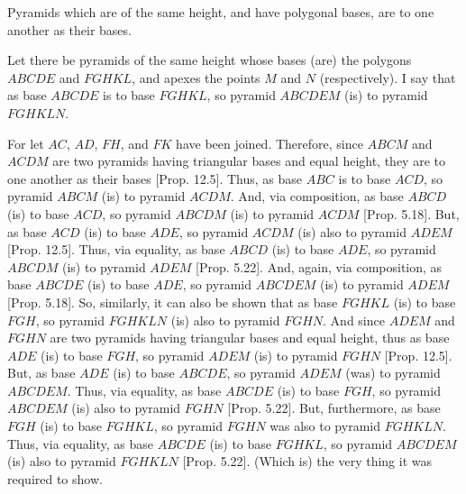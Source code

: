 \begin{Parallel}{}{}
{Pyramids which are of the same height, and have polygonal bases, are to one
another as their bases.\\

\centerline{}

Let there be pyramids of the same height whose bases (are) the polygons $ABCDE$ and $FGHKL$,
and apexes the points $M$ and $N$ (respectively). I say that as base $ABCDE$ is to base $FGHKL$,
so pyramid $ABCDEM$ (is) to pyramid $FGHKLN$.

For let $AC$, $AD$, $FH$, and $FK$ have been joined. Therefore, since $ABCM$ and
$ACDM$ are two pyramids having triangular bases and equal height, they are to one another
as their bases [Prop. 12.5]. Thus, as base $ABC$ is to base $ACD$, so pyramid 
$ABCM$ (is) to pyramid $ACDM$.  And, via composition, as base $ABCD$ (is) to base $ACD$, so
pyramid $ABCDM$ (is) to pyramid $ACDM$ [Prop. 5.18]. But, as base
$ACD$ (is) to base $ADE$, so pyramid $ACDM$ (is) also to pyramid $ADEM$ [Prop. 12.5]. Thus, via equality, 
as base $ABCD$ (is) to base $ADE$, so pyramid $ABCDM$ (is) to  pyramid $ADEM$ [Prop. 5.22]. And, again, via composition, as base $ABCDE$ (is) to base $ADE$,
so pyramid $ABCDEM$ (is) to pyramid $ADEM$ [Prop. 5.18]. 
So, similarly, it can also be shown that as base $FGHKL$ (is) to base $FGH$, so pyramid 
$FGHKLN$ (is) also to pyramid $FGHN$. And since $ADEM$ and $FGHN$ are two
pyramids having triangular bases and equal height,  thus as base $ADE$ (is) to base $FGH$, so
pyramid $ADEM$ (is) to pyramid $FGHN$ [Prop. 12.5]. 
But, as base $ADE$ (is) to base $ABCDE$,  so pyramid $ADEM$ (was) to 
pyramid $ABCDEM$. Thus, via equality,  as base $ABCDE$ (is) to base $FGH$,
so pyramid $ABCDEM$ (is) also to pyramid $FGHN$ [Prop. 5.22]. But,
furthermore, as base $FGH$ (is) to base $FGHKL$, so pyramid $FGHN$ was also to pyramid
$FGHKLN$. Thus, via equality, as base $ABCDE$ (is) to base $FGHKL$, so
pyramid $ABCDEM$ (is) also to pyramid $FGHKLN$  [Prop. 5.22]. (Which is) the very thing it was required
to show.}
\end{Parallel}

